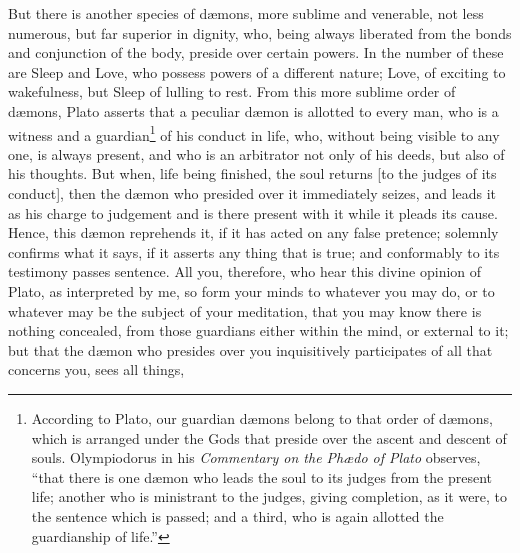 \documentclass[twoside]{article}
\begin{document}
But there is another species of d{\ae}mons, more sublime and venerable, not
less numerous, but far superior in dignity, who, being always liberated from
the bonds and conjunction of the body, preside over certain powers. In the
number of these are Sleep and Love, who possess powers of a different nature;
Love, of exciting to wakefulness, but Sleep of lulling to rest. From this more
sublime order of d{\ae}mons, Plato asserts that a peculiar d{\ae}mon is
allotted to every man, who is a witness and a guardian\footnote{According to
Plato, our guardian d{\ae}mons belong to that order of d{\ae}mons, which is
arranged under the Gods that preside over the ascent and descent of souls.
Olympiodorus in his \textit{Commentary on the Ph{\ae}do of Plato} observes,
``that there is one d{\ae}mon who leads the soul to its judges from the present
life; another who is ministrant to the judges, giving completion, as it were,
to the sentence which is passed; and a third, who is again allotted the
guardianship of life.''} of his conduct in life, who, without being visible to
any one, is always present, and who is an arbitrator not only of his deeds, but
also of his thoughts.  But when, life being finished, the soul returns [to the
judges of its conduct], then the d{\ae}mon who presided over it immediately
seizes, and leads it as his charge to judgement and is there present with it
while it pleads its cause. Hence, this d{\ae}mon reprehends it, if it has acted
on any false pretence; solemnly confirms what it says, if it asserts any thing
that is true; and conformably to its testimony passes sentence. All you,
therefore, who hear this divine opinion of Plato, as interpreted by me, so form
your minds to whatever you may do, or to whatever may be the subject of your
meditation, that you may know there is nothing concealed, from those guardians
either within the mind, or external to it; but that the d{\ae}mon who presides
over you inquisitively participates of all that concerns you, sees all things,
\end{document}
